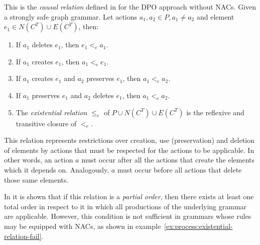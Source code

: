 \begin{definition} This is the \emph{causal relation} defined in \cite{Corradini1996} for the DPO approach without NACs. Given  \doublyTypedGraphGrammarCore{} a strongly safe graph grammar. Let actions \mbox{$a_1, a_2 \in P, a_1 \ne a_2$} and element \mbox{$e_1 \in N(C^T) \cup E(C^T)$}, then:

  \begin{enumerate}
    \item If $a_1$ deletes $e_1$, then $e_1 <_e a_1$.
    \item If $a_1$ creates $e_1$, then $a_1 <_e e_1$.
    \item If $a_1$ creates $e_1$ and $a_2$ preserves $e_1$, then $a_1 <_e a_2$.
    \item If $a_1$ preserves $e_1$ and $a_2$ deletes $e_1$, then $a_1 <_e a_2$. 
    \item The \emph{existential relation} $\leq_e$ of $P \cup N(C^T) \cup E(C^T)$ is the reflexive and transitive closure of $<_e$.
  \end{enumerate}
\end{definition}

This relation represents restrictions over creation, use (preservation) and deletion of elements by actions that must be respected for the actions to be applicable. In other words, an action $a$ must occur after all the actions that create the elements which it depends on. Analogously, $a$ must occur before all actions that delete those same elements.

In \cite{Corradini1996} it is shown that if this relation is a \emph{partial order}, then there exists at least one total order in respect to it in which all productions of the underlying grammar are applicable. However, this condition is not sufficient in grammars whose rules may be equipped with NACs, as shown in example~\ref{ex:process:existential-relation-fail}.


